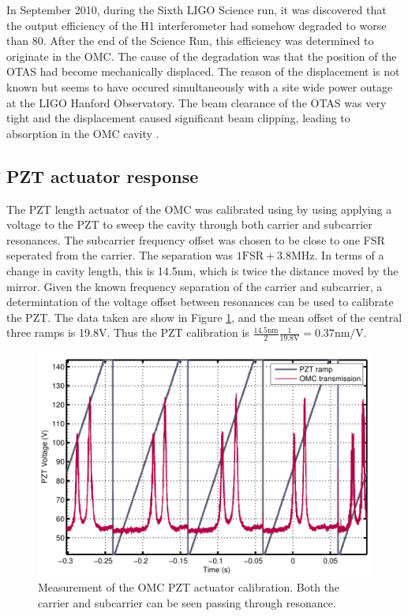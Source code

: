 In September 2010, during the Sixth LIGO Science run, it was discovered that the output efficiency of the H1 interferometer had somehow degraded to worse than 80\perc{}. %
After the end of the Science Run, this efficiency was determined to originate in the OMC. %
The cause of the degradation was that the position of the OTAS had become mechanically displaced. %
The reason of the displacement is not known but seems to have occured simultaneously with a site wide power outage at the LIGO Hanford Observatory. %
The beam clearance of the OTAS was very tight and the displacement caused significant beam clipping, leading to absorption in the OMC cavity \cite{T1100562}.

\subsection{PZT actuator response}
The PZT length actuator of the OMC was calibrated using by using applying a voltage to the PZT to sweep the cavity through both carrier and subcarrier resonances. %
The subcarrier frequency offset was chosen to be close to one FSR seperated from the carrier. %
The separation was $1\mathrm{FSR}+3.8$MHz. %
In terms of a change in cavity length, this is 14.5nm, which is twice the distance moved by the mirror. %
Given the known frequency separation of the carrier and subcarrier, a determintation of the voltage offset between resonances can be used to calibrate the PZT. %
The data taken are show in Figure \ref{fig:pztsweep}, and the mean offset of the central three ramps is 19.8V. %
Thus the PZT calibration is $\frac{14.5\text{nm}}{2}\frac{1}{19.8\text{V}}=0.37\text{nm}/\text{V}$.
\begin{figure}
  \begin{center}
  \leavevmode
  \includegraphics{figs-omc/pztdccal.pdf}
  \end{center}
  \caption[Measurement of the OMC PZT actuator calibration.]{Measurement of the OMC PZT actuator calibration. Both the carrier and subcarrier can be seen passing through resonance.}
  \label{fig:pztsweep}
\end{figure}


